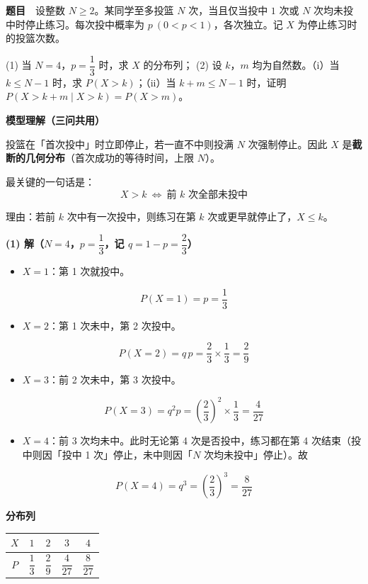 \par\medskip


\textbf{题目}　设整数 $N\ge2$。某同学至多投篮 $N$ 次，当且仅当投中 $1$ 次或 $N$ 次均未投中时停止练习。每次投中概率为 $p\ (0<p<1)$，各次独立。记 $X$ 为停止练习时的投篮次数。

  (1) 当 $N=4$，$p=\dfrac13$ 时，求 $X$ 的分布列；
  (2) 设 $k$，$m$ 均为自然数。（i）当 $k\le N-1$ 时，求 $P(X>k)$；（ii）当 $k+m\le N-1$ 时，证明 $P(X>k+m\mid X>k)=P(X>m)$。

\par\medskip

\textbf{模型理解（三问共用）}

投篮在「首次投中」时立即停止，若一直不中则投满 $N$ 次强制停止。因此 $X$ 是\textbf{截断的几何分布}（首次成功的等待时间，上限 $N$）。

最关键的一句话是：
\[\boxed{X>k\ \Longleftrightarrow\ \text{前 }k\text{ 次全部未投中}}\]

理由：若前 $k$ 次中有一次投中，则练习在第 $k$ 次或更早就停止了，$X\le k$。

\par\medskip

\textbf{(1) 解（$N=4$，$p=\dfrac13$，记 $q=1-p=\dfrac23$）}

\begin{itemize}
\item $X=1$：第 1 次就投中。
\end{itemize}
\[P(X=1)=p=\frac13\]
\begin{itemize}
\item $X=2$：第 1 次未中，第 2 次投中。
\end{itemize}
\[P(X=2)=q\,p=\frac23\times\frac13=\frac29\]
\begin{itemize}
\item $X=3$：前 2 次未中，第 3 次投中。
\end{itemize}
\[P(X=3)=q^2p=\left(\frac23\right)^2\times\frac13=\frac{4}{27}\]
\begin{itemize}
\item $X=4$：前 3 次均未中。此时无论第 4 次是否投中，练习都在第 4 次结束（投中则因「投中 1 次」停止，未中则因「$N$ 次均未投中」停止）。故
\end{itemize}
\[P(X=4)=q^3=\left(\frac23\right)^3=\frac{8}{27}\]

\textbf{分布列}

\begin{center}
\begin{tabular}{ccccc}
\toprule
$X$ & $1$ & $2$ & $3$ & $4$ \\
\midrule
$P$ & $\dfrac13$ & $\dfrac29$ & $\dfrac{4}{27}$ & $\dfrac{8}{27}$ \\
\bottomrule
\end{tabular}
\end{center}

